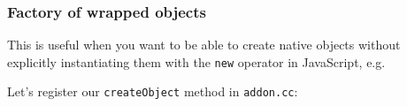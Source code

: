 \begin{Shaded}
\begin{Highlighting}[]
 \NormalTok{(}\NormalTok{);}

  \NormalTok{(}\NormalTok{);}
\NormalTok{( }\NormalTok{() ); }
\NormalTok{( }\NormalTok{() ); }
\NormalTok{( }\NormalTok{() ); }
\end{Highlighting}
\end{Shaded}

\subsubsection{Factory of wrapped
objects}\label{factory-of-wrapped-objects}

This is useful when you want to be able to create native objects without
explicitly instantiating them with the \texttt{new} operator in
JavaScript, e.g.

\begin{Shaded}
\begin{Highlighting}[]
 \NormalTok{();}
\end{Highlighting}
\end{Shaded}

Let's register our \texttt{createObject} method in \texttt{addon.cc}:

